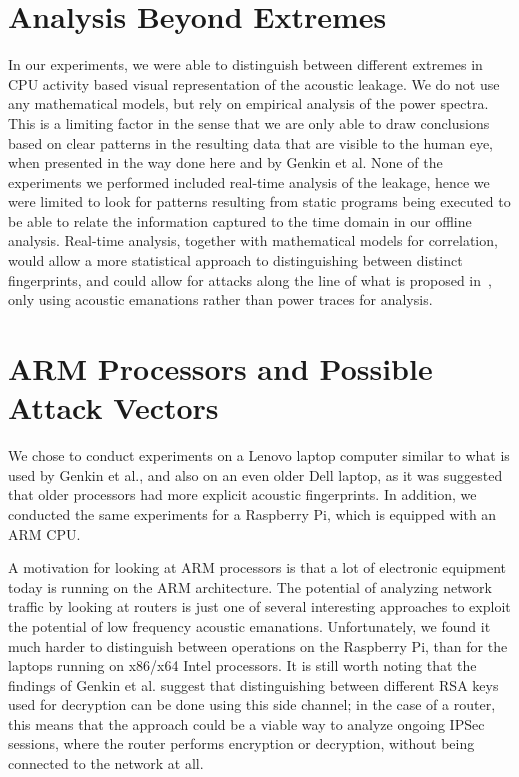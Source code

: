 \section{Analysis Beyond Extremes}
In our experiments, we were able to distinguish between different extremes in \gls{CPU} activity based visual representation of the acoustic leakage. 
We do not use any mathematical models, but rely on empirical analysis of the power spectra. 
This is a limiting factor in the sense that we are only able to draw conclusions based on clear patterns in the resulting data that are visible to the human eye, when presented in the way done here and by Genkin et al.
None of the experiments we performed included real-time analysis of the leakage, hence we were limited to look for patterns resulting from static programs being executed to be able to relate the information captured to the time domain in our offline analysis.
Real-time analysis, together with mathematical models for correlation, would allow a more statistical approach to distinguishing between distinct fingerprints, and could allow for attacks along the line of what is proposed in~\cite{DBLP:conf/crypto/KocherJJ99}, only using acoustic emanations rather than power traces for analysis.


\section{ARM Processors and Possible Attack Vectors}
We chose to conduct experiments on a Lenovo laptop computer similar to what is used by Genkin et al., and also on an even older Dell laptop, as it was suggested that older processors had more explicit acoustic fingerprints.
In addition, we conducted the same experiments for a Raspberry Pi, which is equipped with an ARM \gls{CPU}.

A motivation for looking at ARM processors is that a lot of electronic equipment today is running on the ARM architecture.
The potential of analyzing network traffic by looking at routers is just one of several interesting approaches to exploit the potential of low frequency acoustic emanations.
Unfortunately, we found it much harder to distinguish between operations on the Raspberry Pi, than for the laptops running on x86/x64 Intel processors.
It is still worth noting that the findings of Genkin et al. suggest that distinguishing between different RSA keys used for decryption can be done using this side channel; in the case of a router, this means that the approach could be a viable way to analyze ongoing IPSec sessions, where the router performs encryption or decryption, without being connected to the network at all.


